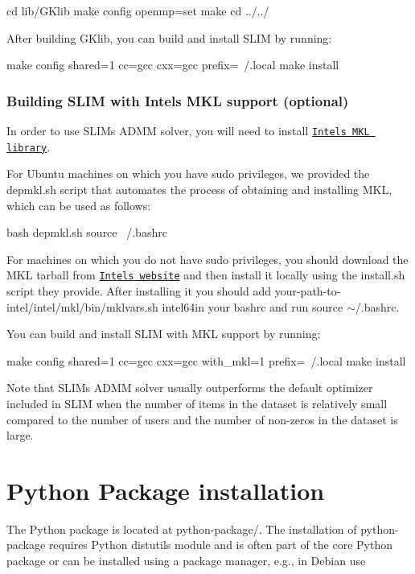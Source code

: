 \begin{DoxyVerb}cd lib/GKlib
make config openmp=set
make
cd ../../
\end{DoxyVerb}


After building G\+Klib, you can build and install S\+L\+IM by running\+:

\begin{DoxyVerb}make config shared=1 cc=gcc cxx=gcc prefix=~/.local
make install
\end{DoxyVerb}
\hypertarget{index_mkl_build}{}\subsubsection{Building S\+L\+I\+M with Intel\textquotesingle{}s M\+K\+L support (optional)}\label{index_mkl_build}
In order to use S\+L\+IM\textquotesingle{}s A\+D\+MM solver, you will need to install \href{https://software.intel.com/en-us/mkl}{\tt Intel\textquotesingle{}s M\+KL library}.

For Ubuntu machines on which you have {\ttfamily sudo} privileges, we provided the {\ttfamily depmkl.\+sh} script that automates the process of obtaining and installing M\+KL, which can be used as follows\+:

\begin{DoxyVerb}bash depmkl.sh
source ~/.bashrc 
\end{DoxyVerb}


For machines on which you do not have {\ttfamily sudo} privileges, you should download the M\+KL tarball from \href{https://software.intel.com/en-us/mkl}{\tt Intel\textquotesingle{}s website} and then install it locally using the {\ttfamily install.\+sh} script they provide. After installing it you should add {\ttfamily your-\/path-\/to-\/intel/intel/mkl/bin/mklvars.\+sh intel64}in your bashrc and run {\ttfamily source $\sim$/.bashrc}.

You can build and install S\+L\+IM with M\+KL support by running\+:

\begin{DoxyVerb}make config shared=1 cc=gcc cxx=gcc with_mkl=1 prefix=~/.local
make install
\end{DoxyVerb}


Note that S\+L\+IM\textquotesingle{}s A\+D\+MM solver usually outperforms the default optimizer included in S\+L\+IM when the number of items in the dataset is relatively small compared to the number of users and the number of non-\/zeros in the dataset is large.\hypertarget{index_pythonpackage}{}\section{Python Package installation}\label{index_pythonpackage}
The Python package is located at {\ttfamily python-\/package/}. The installation of python-\/package requires Python {\ttfamily distutils} module and is often part of the core Python package or can be installed using a package manager, e.\+g., in Debian use

